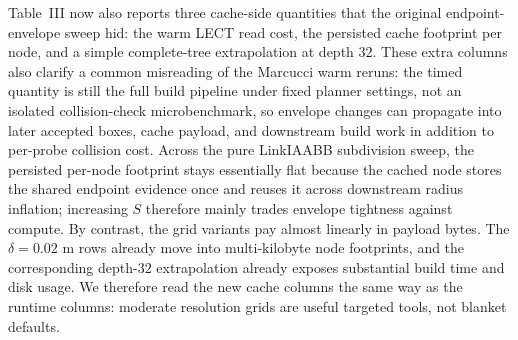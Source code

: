 \documentclass[journal]{IEEEtran}
\begin{document}
Table~III now also reports three cache-side quantities that the original
endpoint-envelope sweep hid: the warm LECT read cost, the persisted cache
footprint per node, and a simple complete-tree extrapolation at depth $32$.
These extra columns also clarify a common misreading of the Marcucci warm
reruns: the timed quantity is still the full build pipeline under fixed planner
settings, not an isolated collision-check microbenchmark, so envelope changes
can propagate into later accepted boxes, cache payload, and downstream build
work in addition to per-probe collision cost. Across the pure
LinkIAABB subdivision sweep, the persisted per-node footprint stays
essentially flat because the cached node stores the shared endpoint evidence
once and reuses it across downstream radius inflation; increasing $S$
therefore mainly trades envelope tightness against compute. By contrast, the
grid variants pay almost linearly in payload bytes. The $\delta=0.02$ m rows
already move into multi-kilobyte node footprints, and the corresponding
depth-$32$ extrapolation already exposes substantial build time and disk usage. We therefore
read the new cache columns the same way as the runtime columns: moderate
resolution grids are useful targeted tools, not blanket defaults.



\end{document}
